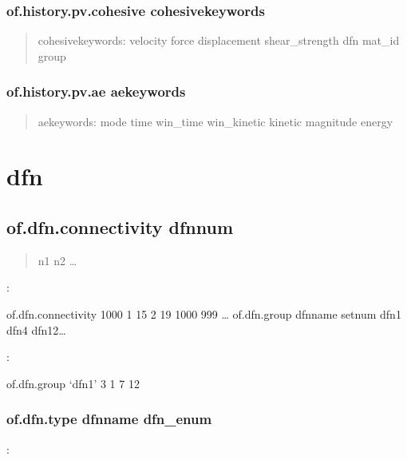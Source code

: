 \documentclass[letterpaper,10pt,english]{sphinxmanual}
\begin{document}
\subsection{of.history.pv.cohesive cohesivekeywords}
\label{\detokenize{rst_tutorials/command_line_guide:of-history-pv-cohesive-cohesivekeywords}}\begin{quote}

cohesivekeywords: velocity force displacement shear\_strength dfn
mat\_id group
\end{quote}


\subsection{of.history.pv.ae aekeywords}
\label{\detokenize{rst_tutorials/command_line_guide:of-history-pv-ae-aekeywords}}\begin{quote}

aekeywords: mode time win\_time win\_kinetic kinetic magnitude energy
\end{quote}


\chapter{dfn}
\label{\detokenize{rst_tutorials/command_line_guide:dfn}}

\section{of.dfn.connectivity dfnnum}
\label{\detokenize{rst_tutorials/command_line_guide:of-dfn-connectivity-dfnnum}}\begin{quote}

n1 n2 …
\end{quote}

:

\begin{sphinxVerbatim}[commandchars=\\\{\}]
of.dfn.connectivity 1000 1 15 2 19 1000 999 …
of.dfn.group dfnname setnum dfn1 dfn4 dfn12…
\end{sphinxVerbatim}

:

\begin{sphinxVerbatim}[commandchars=\\\{\}]
of.dfn.group ‘dfn\PYGZus{}1’ 3 1 7 12
\end{sphinxVerbatim}


\subsection{of.dfn.type dfnname dfn\_enum}
\label{\detokenize{rst_tutorials/command_line_guide:of-dfn-type-dfnname-dfn-enum}}\label{\detokenize{rst_tutorials/command_line_guide:section-24}}
:
\end{document}
